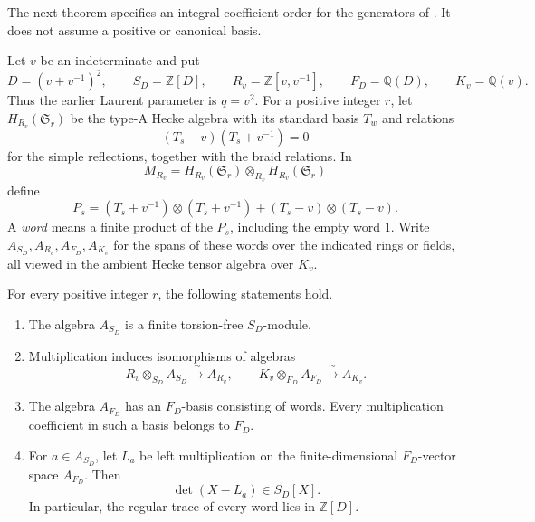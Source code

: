 The next theorem specifies an integral coefficient order for the generators of \citet[Definition 11.1, equation (93), p.~59]{BSM2013}. It does not assume a positive or canonical basis.

Let $v$ be an indeterminate and put
\[
 D=(v+v^{-1})^2,\qquad S_D=\mathbb Z[D],\qquad
 R_v=\mathbb Z[v,v^{-1}],\qquad
 F_D=\mathbb Q(D),\qquad K_v=\mathbb Q(v).
\]
Thus the earlier Laurent parameter is $q=v^2$. For a positive integer $r$, let $H_{R_v}(\mathfrak S_r)$ be the type-A Hecke algebra with its standard basis $T_w$ and relations
\[
 (T_s-v)(T_s+v^{-1})=0
\]
for the simple reflections, together with the braid relations. In
\[
 M_{R_v}=H_{R_v}(\mathfrak S_r)\otimes_{R_v}
 H_{R_v}(\mathfrak S_r)
\]
define
\[
 P_s=(T_s+v^{-1})\otimes(T_s+v^{-1})
       +(T_s-v)\otimes(T_s-v).
\]
A \emph{word} means a finite product of the $P_s$, including the empty word $1$. Write $A_{S_D},A_{R_v},A_{F_D},A_{K_v}$ for the spans of these words over the indicated rings or fields, all viewed in the ambient Hecke tensor algebra over $K_v$.

\begin{theorem}\label{thm:hecke-word-descent}
For every positive integer $r$, the following statements hold.
\begin{enumerate}
\item The algebra $A_{S_D}$ is a finite torsion-free $S_D$-module.
\item Multiplication induces isomorphisms of algebras
\[
 R_v\otimes_{S_D}A_{S_D}\xrightarrow{\ \sim\ }A_{R_v},
 \qquad
 K_v\otimes_{F_D}A_{F_D}\xrightarrow{\ \sim\ }A_{K_v}.
\]
\item The algebra $A_{F_D}$ has an $F_D$-basis consisting of words. Every multiplication coefficient in such a basis belongs to $F_D$.
\item For $a\in A_{S_D}$, let $L_a$ be left multiplication on the finite-dimensional $F_D$-vector space $A_{F_D}$. Then
\[
 \det(X-L_a)\in S_D[X].
\]
In particular, the regular trace of every word lies in $\mathbb Z[D]$.
\end{enumerate}
\end{theorem}

